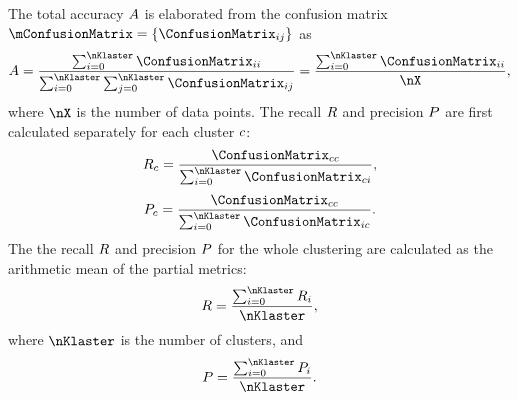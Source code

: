 \documentclass{amcs}
\newcommand{\efn}{extensional fuzzy number}
\begin{document}
The total accuracy $A$ is elaborated from the confusion matrix $\mConfusionMatrix = \{\ConfusionMatrix_{ij}\}$ as
 \begin{align}
 	\accuracy = \frac{\sum_{i=0}^{\nKlaster}\ConfusionMatrix_{ii}}{\sum_{i=0}^{\nKlaster}\sum_{j=0}^{\nKlaster}\ConfusionMatrix_{ij}} 
 	 = \frac{\sum_{i=0}^{\nKlaster}\ConfusionMatrix_{ii}}{\nX},
 \end{align}
 where $\nX$ is the number of data points.
The recall $R$ and precision $P$ are first calculated separately for each cluster $c$: 
 \begin{align}
 	\recall_{\klaster} = \frac{\ConfusionMatrix_{\klaster\klaster}}{\sum_{i=0}^{\nKlaster}\ConfusionMatrix_{\klaster i}},
 	\label{eq:recall}
 \end{align}
 \begin{align}
 	\precision_{\klaster} = \frac{\ConfusionMatrix_{\klaster\klaster}}{\sum_{i=0}^{\nKlaster}\ConfusionMatrix_{i \klaster}}.
 	\label{eq:precision}
 \end{align}
 The the recall $R$ and precision $P$ for the whole clustering are calculated as the arithmetic mean of the partial metrics:
 \begin{align}
 	\recall = \frac{\sum_{i=0}^{\nKlaster}\recall_{i}}{\nKlaster},
 \end{align}
 where $\nKlaster$ is the number of clusters, and
 \begin{align}
 	\precision = \frac{\sum_{i=0}^{\nKlaster}\precision_{i}}{\nKlaster}.
 \end{align}
 
 
\end{document}
